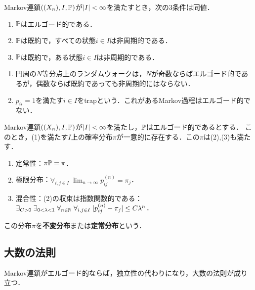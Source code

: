 \documentclass[uplatex,dvipdfmx]{jsreport}
\begin{document}
\begin{lemma}[エルゴード性の特徴付け]
    Markov連鎖$((X_n),I,\mathbb{P})$が$\lvert I\rvert<\infty$を満たすとき，次の3条件は同値．
    \begin{enumerate}
        \item $\mathbb{P}$はエルゴード的である．
        \item $\mathbb{P}$は既約で，すべての状態$i\in I$は非周期的である．
        \item $\mathbb{P}$は既約で，ある状態$i\in I$は非周期的である．
    \end{enumerate}
\end{lemma}

\begin{example}\mbox{}
    \begin{enumerate}
        \item 円周の$N$等分点上のランダムウォークは，$N$が奇数ならばエルゴード的であるが，偶数ならば既約であっても非周期的にはならない．
        \item $p_{ii}=1$を満たす$i\in I$をtrapという．これがあるMarkov過程はエルゴード的でない．
    \end{enumerate}
\end{example}

\begin{theorem}[有限状態Markov過程のエルゴード定理]
    Markov連鎖$((X_n),I,\mathbb{P})$が$\lvert I\rvert<\infty$を満たし，$\mathbb{P}$はエルゴード的であるとする．
    このとき，(1)を満たす$I$上の確率分布$\pi$が一意的に存在する．この$\pi$は(2),(3)も満たす．
    \begin{enumerate}
        \item 定常性：$\pi\mathbb{P}=\pi$．
        \item 極限分布：$\forall_{i,j\in I}\;\lim_{n\to\infty}p_{ij}^{(n)}=\pi_j$．
        \item 混合性：(2)の収束は指数関数的である：$\exists_{C>0}\;\exists_{0<\lambda<1}\;\forall_{n\in\mathbb{N}}\;\forall_{i,j\in I}\;\lvert p_{ij}^{(n)}-\pi_j\rvert\le C\lambda^n$．
    \end{enumerate}
    この分布$\pi$を\textbf{不変分布}または\textbf{定常分布}という．
\end{theorem}

\subsection{大数の法則}

\begin{tcolorbox}[colframe=ForestGreen, colback=ForestGreen!10!white,breakable,colbacktitle=ForestGreen!40!white,coltitle=black,fonttitle=\bfseries\sffamily,
title=]
    Markov連鎖がエルゴード的ならば，独立性の代わりになり，大数の法則が成り立つ．
\end{tcolorbox}
\end{document}
